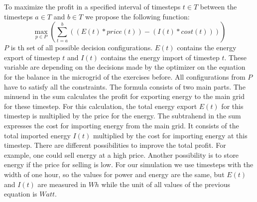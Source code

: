 To maximize the profit in a specified interval of timesteps $t \in T$ between the timesteps $a \in T$ and $b \in T$ we propose the following function:
\begin{equation} \label{eq:opt}
\max_{p \in P}{(\sum_{t=a}^{b}{((E(t)*price(t))-(I(t)*cost(t)))})}
\end{equation}
$P$ is th set of all possible decision configurations.
$E(t)$ contains the energy export of timestep $t$ and $I(t)$ contains the energy import of timestep $t$.
These variable are depending on the decisions made by the optimizer on the equation for the balance in the microgrid of the exercises before. 
All configurations from $P$ have to satisfy all the constraints. 
The formula consists of two main parts. 
The minuend in the sum calculates the profit for exporting energy to the main grid for these timestep. 
For this calculation, the total energy export $E(t)$ for this timestep is multiplied by the price for the energy. 
The subtrahend in the sum expresses the cost for importing energy from the main grid. 
It consists of the total imported energy $I(t)$ multiplied by the cost for importing energy at this timestep. 
There are different possibilities to improve the total profit. 
For example, one could sell energy at a high price. 
Another possibility is to store energy if the price for selling is low. 
For our simulation we use timesteps with the width of one hour, so the values for power and energy are the same, but $E(t)$ and $I(t)$ are measured in $Wh$ while the unit of all values of the previous equation is $Watt$.

